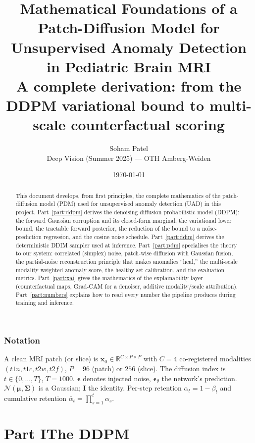 \documentclass[12pt,a4paper]{article}
\title{\textbf{Mathematical Foundations of a Patch-Diffusion Model for\\
Unsupervised Anomaly Detection in Pediatric Brain MRI}\\[4pt]
\large A complete derivation: from the DDPM variational bound to multi-scale
counterfactual scoring}
\author{Soham Patel \\ \small Deep Vision (Summer 2025) --- OTH Amberg-Weiden}
\date{\today}
\newcommand{\R}{\mathbb{R}}
\newcommand{\N}{\mathcal{N}}
\newcommand{\x}{\bm{x}}
\newcommand{\eps}{\bm{\epsilon}}
\newcommand{\II}{\mathbf{I}}
\newcommand{\abar}{\bar{\alpha}}
\begin{document}
\maketitle
\tableofcontents
\bigskip

\begin{abstract}
\noindent This document develops, from first principles, the complete
mathematics of the patch-diffusion model (PDM) used for unsupervised anomaly
detection (UAD) in this project. Part~\ref{part:ddpm} derives the denoising
diffusion probabilistic model (DDPM): the forward Gaussian corruption and its
closed-form marginal, the variational lower bound, the tractable forward
posterior, the reduction of the bound to a noise-prediction regression, and the
cosine noise schedule. Part~\ref{part:ddim} derives the deterministic DDIM
sampler used at inference. Part~\ref{part:pdm} specialises the theory to our
system: correlated (simplex) noise, patch-wise diffusion with Gaussian fusion,
the partial-noise reconstruction principle that makes anomalies ``heal,'' the
multi-scale modality-weighted anomaly score, the healthy-set calibration, and
the evaluation metrics. Part~\ref{part:xai} gives the mathematics of the
explainability layer (counterfactual maps, Grad-CAM for a denoiser, additive
modality/scale attribution). Part~\ref{part:numbers} explains how to read every
number the pipeline produces during training and inference.
\end{abstract}

\section*{Notation}
A clean MRI patch (or slice) is $\x_0\in\R^{C\times P\times P}$ with $C=4$ co-registered
modalities $(t1n,t1c,t2w,t2f)$, $P=96$ (patch) or $256$ (slice). The diffusion
index is $t\in\{0,\dots,T\}$, $T=1000$. $\eps$ denotes injected noise, $\eps_\theta$
the network's prediction. $\N(\bm\mu,\bm\Sigma)$ is a Gaussian; $\II$ the identity.
Per-step retention $\alpha_t=1-\beta_t$ and cumulative retention
$\abar_t=\prod_{s=1}^{t}\alpha_s$.

\part*{Part I\quad The DDPM}
\label{part:ddpm}
\end{document}
